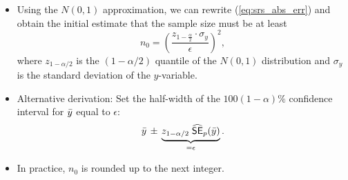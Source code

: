 \documentclass{my_eth_beamer}
\numberwithin{equation}{section}
\begin{document}
\begin{frame}
    \begin{itemize}
    \setlength{\itemsep}{10pt}
        \item Using the $N(0,1)$ approximation, we can rewrite
            (\ref{eq:srs_abs_err}) and obtain the \alert{initial estimate}
            that the sample size must be at least
            \begin{equation}\label{eq:srs_n}
                n_0 = \left(\frac{z_{1 - \frac{\alpha}{2}} \cdot
                    \sigma_y}{\epsilon}\right)^2,
            \end{equation}
            \noindent where $z_{1 - \alpha/2}$ is the $(1 - \alpha/2)$
            quantile of the $N(0,1)$ distribution and $\sigma_y$ is the
            standard deviation of the $y$-variable.
        \item \alert{Alternative derivation}: Set the half-width of the
            $100(1 - \alpha)\%$ confidence interval for $\bar{y}$ equal to
            $\epsilon$:
                \begin{equation*}
                    \bar{y} \, \pm \, \underbrace{z_{1 - \alpha / 2} \;
                        \widehat{\mathsf{SE}}_p(\bar{y})}_{=\epsilon}.
                \end{equation*}
        \item In practice, $n_0$ is \alert{rounded up} to the next integer.
    \end{itemize}
\end{frame}
\end{document}
